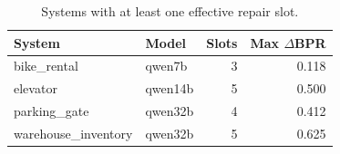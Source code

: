 \begin{table}[htbp]
\centering
\caption{Systems with at least one effective repair slot.}
\label{tab:system-gains}
\small
\setlength{\tabcolsep}{5pt}
\begin{tabular}{@{}l l r r@{}}
\toprule
System & Model & Slots & Max $\Delta$BPR \\
\midrule
bike\_rental & qwen7b & 3 & 0.118 \\
elevator & qwen14b & 5 & 0.500 \\
parking\_gate & qwen32b & 4 & 0.412 \\
warehouse\_inventory & qwen32b & 5 & 0.625 \\
\bottomrule
\end{tabular}
\end{table}

